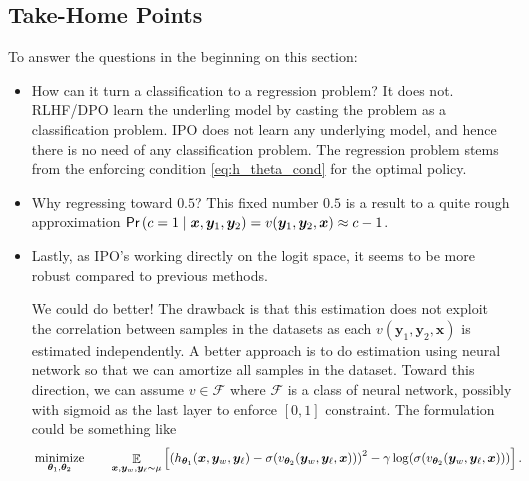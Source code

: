\documentclass[11pt,a4paper]{article}
\begin{document}
\subsection{Take-Home Points}%
\label{sub:take_home_points}
To answer the questions in the beginning on this section:
\begin{itemize}
    \item How can it turn a classification to a regression problem? It does not. RLHF/DPO learn the underling model by casting the problem as a classification problem. IPO does not learn any underlying model, and hence there is no need of any classification problem. The regression problem stems from the enforcing condition \eqref{eq:h_theta_cond} for the optimal policy.
    \item Why regressing toward $0.5$? This fixed number $0.5$ is a result to a quite rough approximation $\textsf{Pr}\left(c=1\mid \bm{x}, \bm{y}_1, \bm{y}_2\right) = v(\bm{y}_1, \bm{y}_2, \bm{x}) \approx c-1$. 
    \item Lastly, as IPO's working directly on the logit space, it seems to be more robust compared to previous methods.

{\blue We could do better!} The drawback is that this estimation does not exploit the correlation between samples in the datasets as each $v(\bm{y}_1, \bm{y}_2, \bm{x})$ is estimated independently.
A better approach is to do estimation using neural network so that we can amortize all samples in the dataset. Toward this direction, we can assume $v \in \mathcal{F}$ where $\mathcal{F}$ is a class of neural network, possibly with sigmoid as the last layer  to enforce $[0,1]$ constraint.
The formulation could be something like
\begin{alignat}{2}
    & \operatorname*{\text{minimize}}_{\boldsymbol \theta_1, \boldsymbol \theta_2} \quad && \mathop{\mathbb{E}}_{\bm{x}, \bm{y}_w, \bm{y}_{\ell }\sim \mu} \left[ \left(  h_{\boldsymbol \theta_1}(\bm{x}, \bm{y}_w, \bm{y}_\ell )  - \sigma(v_{\boldsymbol \theta_2}(\bm{y}_w, \bm{y}_\ell , \bm{x})) \right) ^2 - \gamma \log (\sigma(v_{\boldsymbol \theta_2}(\bm{y}_w, \bm{y}_\ell , \bm{x})))\right].
\end{alignat}


\end{itemize}
\end{document}
